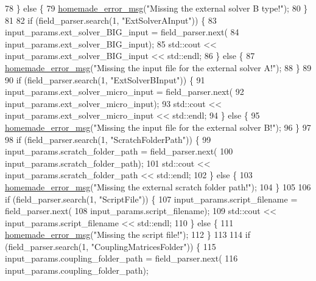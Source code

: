 \begin{DoxyCode}
78     \} \textcolor{keywordflow}{else} \{
79         \hyperlink{common__header_8h_a05d65d26b911668ac90085745dca71f6}{homemade\_error\_msg}(\textcolor{stringliteral}{"Missing the external solver B type!"});
80     \}
81 
82     \textcolor{keywordflow}{if} (field\_parser.search(1, \textcolor{stringliteral}{"ExtSolverAInput"})) \{
83         input\_params.ext\_solver\_BIG\_input = field\_parser.next(
84                 input\_params.ext\_solver\_BIG\_input);
85         std::cout << input\_params.ext\_solver\_BIG\_input << std::endl;
86     \} \textcolor{keywordflow}{else} \{
87         \hyperlink{common__header_8h_a05d65d26b911668ac90085745dca71f6}{homemade\_error\_msg}(\textcolor{stringliteral}{"Missing the input file for the external solver A!"});
88     \}
89 
90     \textcolor{keywordflow}{if} (field\_parser.search(1, \textcolor{stringliteral}{"ExtSolverBInput"})) \{
91         input\_params.ext\_solver\_micro\_input = field\_parser.next(
92                 input\_params.ext\_solver\_micro\_input);
93         std::cout << input\_params.ext\_solver\_micro\_input << std::endl;
94     \} \textcolor{keywordflow}{else} \{
95         \hyperlink{common__header_8h_a05d65d26b911668ac90085745dca71f6}{homemade\_error\_msg}(\textcolor{stringliteral}{"Missing the input file for the external solver B!"});
96     \}
97 
98     \textcolor{keywordflow}{if} (field\_parser.search(1, \textcolor{stringliteral}{"ScratchFolderPath"})) \{
99         input\_params.scratch\_folder\_path = field\_parser.next(
100                 input\_params.scratch\_folder\_path);
101         std::cout << input\_params.scratch\_folder\_path << std::endl;
102     \} \textcolor{keywordflow}{else} \{
103         \hyperlink{common__header_8h_a05d65d26b911668ac90085745dca71f6}{homemade\_error\_msg}(\textcolor{stringliteral}{"Missing the external scratch folder path!"});
104     \}
105 
106     \textcolor{keywordflow}{if} (field\_parser.search(1, \textcolor{stringliteral}{"ScriptFile"})) \{
107         input\_params.script\_filename = field\_parser.next(
108                 input\_params.script\_filename);
109         std::cout << input\_params.script\_filename << std::endl;
110     \} \textcolor{keywordflow}{else} \{
111         \hyperlink{common__header_8h_a05d65d26b911668ac90085745dca71f6}{homemade\_error\_msg}(\textcolor{stringliteral}{"Missing the script file!"});
112     \}
113 
114     \textcolor{keywordflow}{if} (field\_parser.search(1, \textcolor{stringliteral}{"CouplingMatricesFolder"})) \{
115         input\_params.coupling\_folder\_path = field\_parser.next(
116                 input\_params.coupling\_folder\_path);

\end{DoxyCode}
